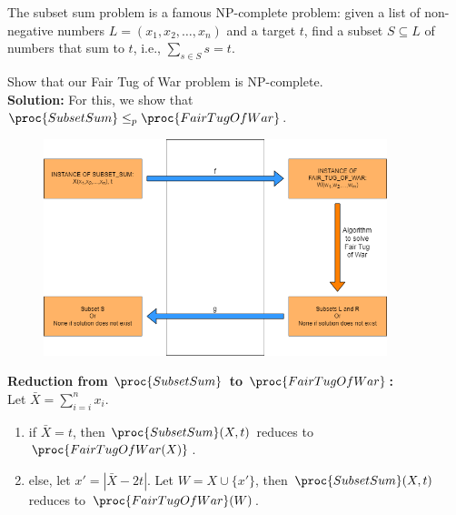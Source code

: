 \documentclass[11pt]{article}
\begin{document}
The subset sum problem is a famous NP-complete problem: given a list of non-negative numbers $L=(x_1,x_2,\ldots,x_n)$ and a target $t$, find a subset $S\subseteq L$ of numbers that sum to $t$, i.e., $\sum_{s\in S} s = t$.

Show that our Fair Tug of War problem is NP-complete.
\\

\noindent\textbf{Solution:}
For this, we show that $\proc{SubsetSum} \leq_{p} \proc{FairTugOfWar}$.

\begin{figure}[h]
\centering
    \includegraphics[width=100mm]{Q2.png}
\end{figure}

\noindent\textbf{Reduction from $\proc{SubsetSum}$ to $\proc{FairTugOfWar}$:}\\
Let $\bar{X} = \sum_{i = i}^{n} x_i$.
\begin{enumerate}
    \item if $\bar{X} = t$, then $\proc{SubsetSum}(X, t)$ reduces to  $\proc{FairTugOfWar(X)}$.
    \item else, let $x' = |\bar{X}-2t|$. Let $W = X \cup \{x'\}$, then $\proc{SubsetSum}(X, t)$ reduces to $\proc{FairTugOfWar}(W)$.
\end{enumerate}
\end{document}

